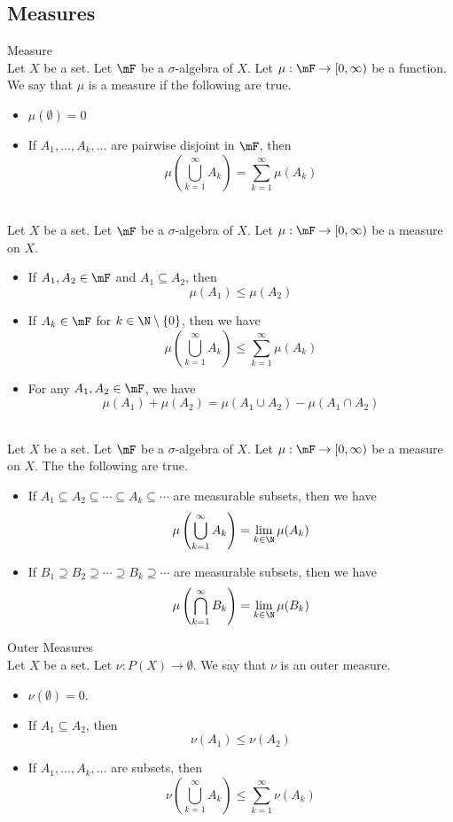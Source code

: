 \documentclass[a4paper]{article}
\begin{document}
\subsection{Measures}
\begin{defn}{Measure}{}\\
Let $X$ be a set. Let $\mF$ be a $\sigma$-algebra of $X$. Let $\mu:\mF\to[0,\infty)$ be a function. We say that $\mu$ is a measure if the following are true. 
\begin{itemize}
\item $\mu(\emptyset)=0$
\item If $A_1,\dots,A_k,\dots$ are pairwise disjoint in $\mF$, then $$\mu\left(\bigcup_{k=1}^\infty A_k\right)=\sum_{k=1}^\infty\mu(A_k)$$
\end{itemize}
\end{defn}

\begin{prp}{}{}\\
Let $X$ be a set. Let $\mF$ be a $\sigma$-algebra of $X$. Let $\mu:\mF\to[0,\infty)$ be a measure on $X$. 
\begin{itemize}
\item If $A_1,A_2\in\mF$ and $A_1\subseteq A_2$, then $$\mu(A_1)\leq\mu(A_2)$$
\item If $A_k\in\mF$ for $k\in\N\setminus\{0\}$, then we have $$\mu\left(\bigcup_{k=1}^\infty A_k\right)\leq\sum_{k=1}^\infty\mu(A_k)$$
\item For any $A_1,A_2\in\mF$, we have $$\mu(A_1)+\mu(A_2)=\mu(A_1\cup A_2)-\mu(A_1\cap A_2)$$
\end{itemize}
\end{prp}

\begin{prp}{}{}\\
Let $X$ be a set. Let $\mF$ be a $\sigma$-algebra of $X$. Let $\mu:\mF\to[0,\infty)$ be a measure on $X$. The the following are true. 
\begin{itemize}
\item If $A_1\subseteq A_2\subseteq\cdots\subseteq A_k\subseteq\cdots$ are measurable subsets, then we have $$\mu\left(\bigcup_{k=1}^\infty A_k\right)=\lim_{k\in\N}\mu(A_k)$$
\item If $B_1\supseteq B_2\supseteq\cdots\supseteq B_k\supseteq\cdots$ are measurable subsets, then we have $$\mu\left(\bigcap_{k=1}^\infty B_k\right)=\lim_{k\in\N}\mu(B_k)$$
\end{itemize}
\end{prp}

\begin{defn}{Outer Measures}{}\\
Let $X$ be a set. Let $\nu:P(X)\to\emptyset$. We say that $\nu$ is an outer measure. 
\begin{itemize}
\item $\nu(\emptyset)=0$. 
\item If $A_1\subseteq A_2$, then $$\nu(A_1)\leq\nu(A_2)$$
\item If $A_1,\dots,A_k,\dots$ are subsets, then $$\nu\left(\bigcup_{k=1}^\infty A_k\right)\leq\sum_{k=1}^\infty\nu(A_k)$$
\end{itemize}
\end{defn}
\end{document}
